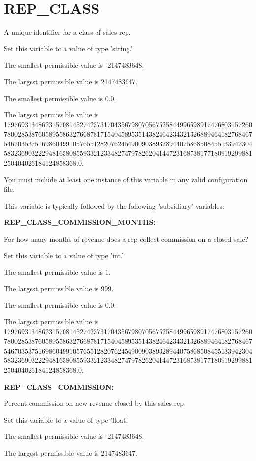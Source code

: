 \section{REP\_CLASS}


A unique identifier for a class of sales rep.

Set this variable to a value of type 'string.'

The smallest permissible value is -2147483648.

The largest permissible value is 2147483647.

The smallest permissible value is 0.0.

The largest permissible value is 179769313486231570814527423731704356798070567525844996598917476803157260780028538760589558632766878171540458953514382464234321326889464182768467546703537516986049910576551282076245490090389328944075868508455133942304583236903222948165808559332123348274797826204144723168738177180919299881250404026184124858368.0.

You must include at least one instance of this variable in any valid configuration file.

This variable is typically followed by the following "subsidiary" variables:


\textbf{REP\_CLASS\_COMMISSION\_MONTHS:}


For how many months of revenue does a rep collect commission on a closed sale?

Set this variable to a value of type 'int.'

The smallest permissible value is 1.

The largest permissible value is 999.

The smallest permissible value is 0.0.

The largest permissible value is 179769313486231570814527423731704356798070567525844996598917476803157260780028538760589558632766878171540458953514382464234321326889464182768467546703537516986049910576551282076245490090389328944075868508455133942304583236903222948165808559332123348274797826204144723168738177180919299881250404026184124858368.0.


\textbf{REP\_CLASS\_COMMISSION:}


Percent commission on new revenue closed by this sales rep

Set this variable to a value of type 'float.'

The smallest permissible value is -2147483648.

The largest permissible value is 2147483647.


